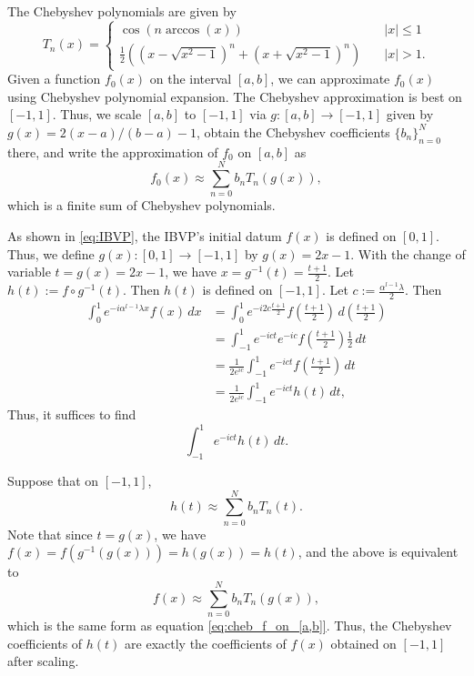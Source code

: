 \documentclass[12pt, oneside, a4paper]{article}
\begin{document}
The Chebyshev polynomials are given by
\[
    T_n(x) =
\begin{cases}
    \cos(n \arccos(x))&\quad\mbox{$|x|\leq 1$}\\
    \frac{1}{2}\left((x-\sqrt{x^2-1})^n + (x+\sqrt{x^2-1})^n\right)&\quad\mbox{$|x|>1$}.
\end{cases}    
\]
Given a function $f_0(x)$ on the interval $[a,b]$, we can approximate $f_0(x)$ using Chebyshev polynomial expansion. The Chebyshev approximation is best on $[-1,1]$. Thus, we scale $[a,b]$ to $[-1,1]$ via $g:[a,b]\to [-1,1]$ given by $g(x)=2(x-a)/(b-a)-1$, obtain the Chebyshev coefficients $\{b_n\}_{n=0}^N$ there, and write the approximation of $f_0$ on $[a,b]$ as
\begin{equation}\label{eq:cheb_f_on_[a,b]}
    f_0(x)\approx \sum_{n=0}^N b_n T_n(g(x)),
\end{equation}
which is a finite sum of Chebyshev polynomials.

As shown in \eqref{eq:IBVP}, the IBVP's initial datum $f(x)$ is defined on $[0,1]$. Thus, we define $g(x):[0,1]\to [-1,1]$ by $g(x)=2x-1$. With the change of variable $t=g(x)=2x-1$, we have $x=g^{-1}(t)=\frac{t+1}{2}$. Let $h(t) := f\circ g^{-1}(t)$. Then $h(t)$ is defined on $[-1,1]$. Let $c:=\frac{\alpha^{l-1}\lambda}{2}$. Then
\begin{align*}
    \int_0^1 e^{-i\alpha^{l-1}\lambda x}f(x)\,dx &= \int_0^1 e^{-i2c\frac{t+1}{2}}f\left(\frac{t+1}{2}\right)\,d\left(\frac{t+1}{2}\right)\\
    &= \int_{-1}^1 e^{-ict}e^{-ic}f\left(\frac{t+1}{2}\right)\frac{1}{2}\,dt\\
    &= \frac{1}{2e^{ic}}\int_{-1}^1 e^{-ict} f\left(\frac{t+1}{2}\right)\,dt\\
    &= \frac{1}{2e^{ic}}\int_{-1}^1 e^{-ict} h(t)\,dt,
\end{align*}
Thus, it suffices to find 
\[\int_{-1}^1 e^{-ict} h(t)\,dt.\]

Suppose that on $[-1,1]$,
\[h(t) \approx \sum_{n=0}^N b_n T_n(t).\]
Note that since $t=g(x)$, we have $f(x) = f(g^{-1}(g(x))) = h(g(x)) = h(t)$, and the above is equivalent to
\[f(x) \approx \sum_{n=0}^N b_n T_n(g(x)),\]
which is the same form as equation \eqref{eq:cheb_f_on_[a,b]}.
Thus, the Chebyshev coefficients of $h(t)$ are exactly the coefficients of $f(x)$ obtained on $[-1,1]$ after scaling. 
\end{document}
